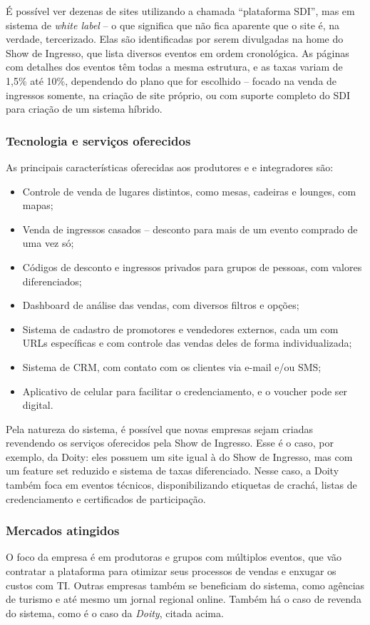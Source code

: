 \documentclass[12pt,a4paper,twoside,hyphens,english,brazil]{abntex2}
\begin{document}
É possível ver dezenas de sites utilizando a chamada ``plataforma SDI'', mas em sistema de \emph{white label} -- o que significa que não fica aparente que o site é, na verdade, tercerizado. Elas são identificadas por serem divulgadas na home do Show de Ingresso, que lista diversos eventos em ordem cronológica. As páginas com detalhes dos eventos têm todas a mesma estrutura, e as taxas variam de 1,5\% até 10\%, dependendo do plano que for escolhido -- focado na venda de ingressos somente, na criação de site próprio, ou com suporte completo do SDI para criação de um sistema híbrido.

\subsubsection*{Tecnologia e serviços oferecidos}
As principais características oferecidas aos produtores e e integradores são:
\begin{itemize}[itemsep=-1ex]
	\item Controle de venda de lugares distintos, como mesas, cadeiras e lounges, com mapas;
	\item Venda de ingressos casados -- desconto para mais de um evento comprado de uma vez só;
	\item Códigos de desconto e ingressos privados para grupos de pessoas, com valores diferenciados;
	\item Dashboard de análise das vendas, com diversos filtros e opções;
	\item Sistema de cadastro de promotores e vendedores externos, cada um com URLs específicas e com controle das vendas deles de forma individualizada;
	\item Sistema de CRM, com contato com os clientes via e-mail e/ou SMS;
	\item Aplicativo de celular para facilitar o credenciamento, e o voucher pode ser digital.
\end{itemize}

Pela natureza do sistema, é possível que novas empresas sejam criadas revendendo os serviços oferecidos pela Show de Ingresso. Esse é o caso, por exemplo, da Doity: eles possuem um site igual à do Show de Ingresso, mas com um feature set reduzido e sistema de taxas diferenciado. Nesse caso, a Doity também foca em eventos técnicos, disponibilizando etiquetas de crachá, listas de credenciamento e certificados de participação.

\subsubsection*{Mercados atingidos}
O foco da empresa é em produtoras e grupos com múltiplos eventos, que vão contratar a plataforma para otimizar seus processos de vendas e enxugar os custos com TI. Outras empresas também se beneficiam do sistema, como agências de turismo e até mesmo um jornal regional online. Também há o caso de revenda do sistema, como é o caso da \emph{Doity}, citada acima.
\end{document}
